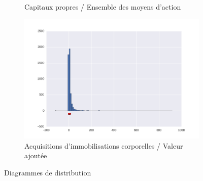 \documentclass[DIV=calc, paper=a4, fontsize=11pt, twocolumn]{scrartcl}
\begin{document}
\begin{appendices}
\begin{figure}
\begin{subfigure}{.45\textwidth}
    \caption{Capitaux propres / Ensemble des moyens d’action}
  \end{subfigure}
  \begin{subfigure}{.45\textwidth}
    \centering
    \includegraphics[width=\linewidth]{r20.png}
    \caption{Acquisitions d'immobilisations corporelles / Valeur ajoutée}
  \end{subfigure}
\caption{Diagrammes de distribution}
\end{figure}


\end{appendices}
\end{document}
